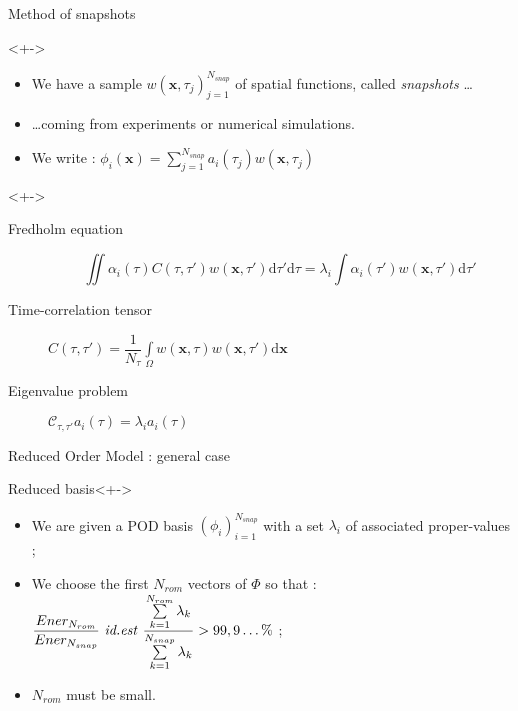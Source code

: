 \begin{frame}{Method of snapshots}
%
\begin{block}{}<+->
\begin{itemize}
\item<+-> We have a sample $w(\mathbf{x},\tau_j)_{j=1}^{N_{snap}}$ of spatial functions, called \emph{snapshots} \dots
\item<+-> \dots coming from experiments or numerical simulations.
\item<+-> We write : %
$\phi_i(\mathbf{x})=\sum\limits_{j=1}^{N_{snap}}a_i(\tau_j) w(\mathbf{x},\tau_j)$
\end{itemize}
\end{block}
%
\begin{block}{}<+->%
\begin{description}
\item %
[Fredholm equation]
\[%
\iint\alpha_i(\tau)C(\tau,\tau')w(\mathbf{x},\tau ')\text{d}\tau'\text{d}\tau%
=\lambda_i\int\alpha_i(\tau')w(\mathbf{x},\tau')\text{d}\tau'%
\]
\item %
[Time-correlation tensor] $C(\tau,\tau ')=\dfrac{1}{N_{\tau}}\int\limits_{\Omega} w(\mathbf{x},\tau)w(\mathbf{x},\tau')\text{d}\mathbf{x}$
\item %
[Eigenvalue problem] %
$\mathcal{C}_{\tau,\tau'}a_i(\tau)=\lambda_i a_i(\tau)$
\end{description}
\end{block}
%
\end{frame}

\begin{frame}{Reduced Order Model : general case}
%
\begin{block}{Reduced basis}<+->
\begin{itemize}
\item<+-> We are given a POD basis $(\phi_i)_{i=1}^{N_{snap}}$ with a set $\lambda_i$ of associated proper-values ;
\item<+-> We choose the first $N_{rom}$ vectors of $\Phi$ so that : %
$\dfrac{Ener_{N_{rom}}}{Ener_{N_{snap}}}\text{ \textit{id.est} }\dfrac{\sum\limits_{k=1}^{N_{rom}}\lambda_k}{\sum\limits_{k=1}^{N_{snap}}\lambda_k} >99,9\dots \%$ ;
\item<+-> $N_{rom}$ must be small.
\end{itemize}
\end{block}
%
\end{frame}

